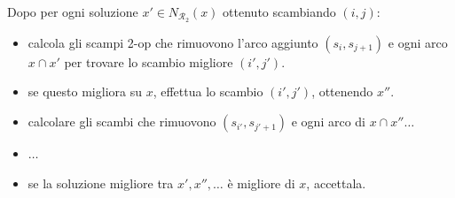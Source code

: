 \documentclass{article}
\begin{document}
Dopo per ogni soluzione $x'\in N_{\mathcal{R}_2}(x)$ ottenuto scambiando $(i,j)$:
\begin{itemize}
    \item calcola gli scampi 2-op che rimuovono l'arco aggiunto $(s_i,s_{j+1})$ e
    ogni arco $x\cap x'$ per trovare lo scambio migliore $(i',j')$.
    \item se questo migliora su $x$, effettua lo scambio $(i',j')$, ottenendo $x''$.
    \item calcolare gli scambi che rimuovono $(s_{i'},s_{j'+1})$ e ogni arco
    di $x\cap x''\dots$
    \item $\dots$
    \item se la soluzione migliore tra $x',x'',\dots$ è migliore di $x$, accettala.
\end{itemize}
\end{document}
